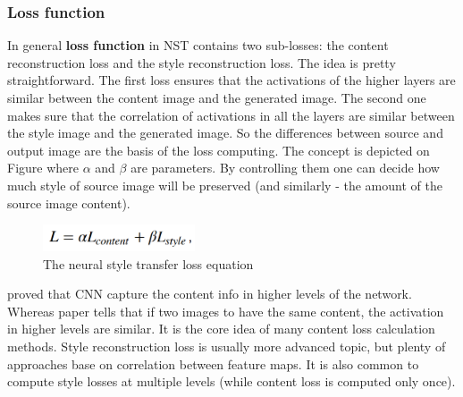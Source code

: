 \documentclass[../Main.tex]{subfiles}
\begin{document}
    \subsubsection{Loss function}
    In general \textbf{loss function} in NST contains two sub-losses: the content reconstruction loss and the style reconstruction loss. The idea is pretty straightforward. The first loss ensures that the activations of the higher layers are similar between the content image and the generated image. The second one makes sure that the correlation of activations in all the layers are similar between the style image and the generated image. So the differences between source and output image are the basis of the loss computing.
    The concept is depicted on Figure  where $\alpha$ and $\beta$ are parameters. By controlling them one can decide how much style of source image will be preserved (and similarly - the amount of the source image content). 
    \begin{figure}[h!]
        \centering
        \includegraphics[width=0.4\textwidth]{loss-equation.png}
        \caption{The neural style transfer loss equation}
        \label{fig:loss-equation}
    \end{figure}
    
     proved that CNN capture the content info in higher levels of the network. Whereas  paper tells that if two images to have the same content, the activation in higher levels are similar. It is the core idea of many content loss calculation methods.
    Style reconstruction loss is usually more advanced topic, but plenty of approaches base on correlation between feature maps. It is also common to compute style losses at multiple levels (while content loss is computed only once).
\end{document}
